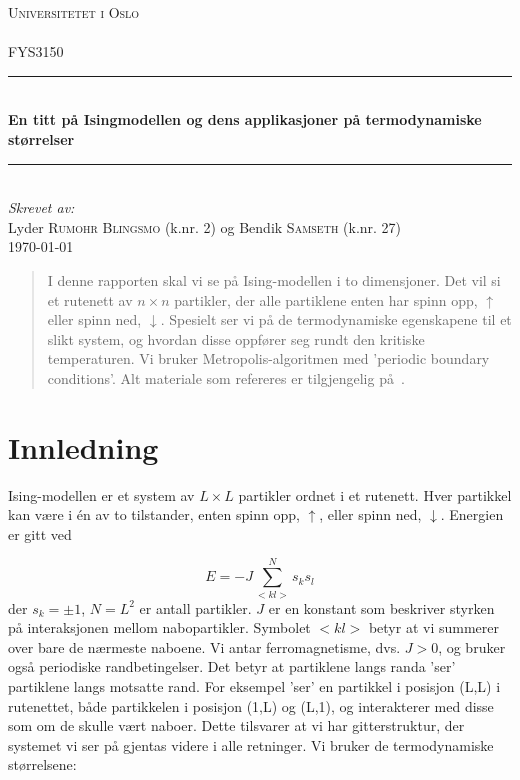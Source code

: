 \documentclass[11pt]{article}
\begin{document}
\begin{titlepage}
  \newcommand{\HRule}{\rule{\linewidth}{0.5mm}}
  \center
  \textsc{\LARGE Universitetet i Oslo}\\[1.5cm] %
  \textsc{\Large }\\[0.5cm] %
  \textsc{\large FYS3150}\\[0.5cm] %
  \HRule \\[0.4cm]
  { \huge \bfseries En titt på Isingmodellen og dens applikasjoner
  på termodynamiske størrelser}\\[0.4cm]
  \HRule \\[1.5cm]
  \Large \emph{Skrevet av:}\\
  Lyder \textsc{Rumohr Blingsmo} (k.nr. 2) og Bendik \textsc{Samseth} (k.nr. 27)\\[3cm]
  {\large \today}\\[3cm]
  \vfill
\end{titlepage}

\begin{abstract}
I denne rapporten skal vi se på Ising-modellen i to dimensjoner. Det vil si
et rutenett av $n \times n $ partikler, der alle partiklene enten har
spinn opp, $\uparrow$ eller spinn ned, $\downarrow$. Spesielt ser vi
på de termodynamiske egenskapene til et slikt system, og hvordan disse
oppfører seg rundt den kritiske temperaturen. Vi bruker
Metropolis-algoritmen med 'periodic boundary conditions'. Alt materiale 
som refereres er tilgjengelig på~\cite{github-repo}. 
\end{abstract}

\section{Innledning}
\label{sec:innledning}
Ising-modellen er et system av $L \times L$ partikler ordnet i et rutenett. 
Hver partikkel kan være i én av to tilstander, enten spinn opp, $\uparrow$,
eller spinn ned, $\downarrow$. Energien er gitt ved 

\begin{equation}
  E=-J\sum_{<kl>}^{N}s_ks_l\label{eq:energi}
\end{equation}
der  $s_k=\pm 1$, $N = L^2$ er antall partikler.
$J$ er en konstant som beskriver styrken på interaksjonen mellom
nabopartikler. Symbolet $<kl>$ betyr at vi summerer over bare de
nærmeste naboene. Vi antar ferromagnetisme, dvs.  $J> 0$, og bruker også
periodiske randbetingelser. Det betyr at partiklene langs randa 'ser' 
partiklene langs motsatte rand. For eksempel 'ser' en partikkel i posisjon
(L,L) i rutenettet, både partikkelen i posisjon (1,L) og (L,1), og interakterer
med disse som om de skulle vært naboer. Dette tilsvarer at vi har
gitterstruktur, der systemet vi ser på gjentas videre i alle
retninger. Vi bruker de termodynamiske størrelsene:
\end{document}
